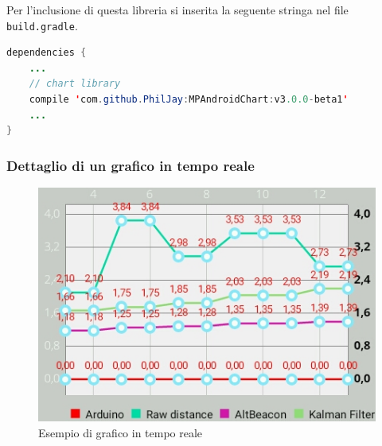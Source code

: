 Per l'inclusione di questa libreria si inserita la seguente stringa nel file \texttt{build.gradle}.
\begin{lstlisting}[language=Java]
dependencies {
	...
	// chart library
	compile 'com.github.PhilJay:MPAndroidChart:v3.0.0-beta1'
	...
}
\end{lstlisting}

\subsubsection{Dettaglio di un grafico in tempo reale}
\begin{figure}[ph]
	\centering
	\includegraphics[width=0.6\linewidth]{img/app/chart1.jpg}
	\caption{Esempio di grafico in tempo reale}
	\label{fig:chart1}
\end{figure}



